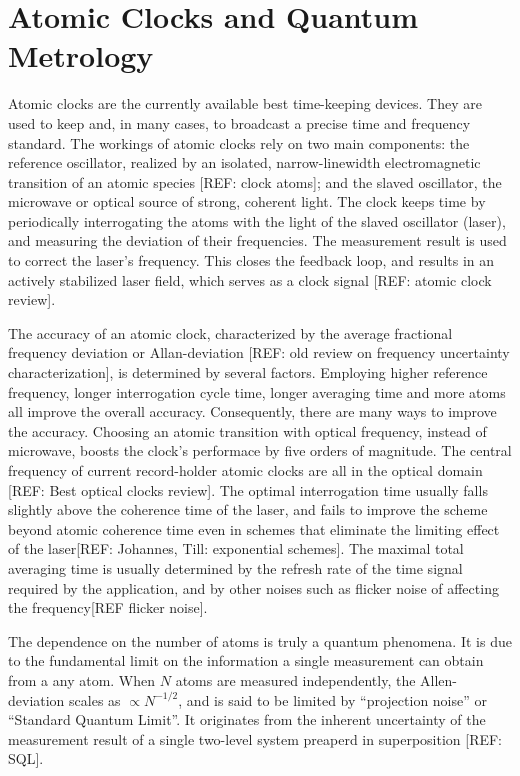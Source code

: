 \section{Atomic Clocks and Quantum Metrology}
Atomic clocks are the currently available best time-keeping devices. They are
used to keep and, in many cases, to broadcast a precise time and frequency
standard. The workings of atomic clocks rely on two main components: the
reference oscillator, realized by an isolated, narrow-linewidth
electromagnetic transition of an atomic species [REF: clock atoms]; and the
slaved oscillator, the microwave or optical source of strong, coherent light. The clock keeps time by
periodically interrogating the atoms with the light of the slaved
oscillator (laser), and measuring the deviation of their frequencies. The
measurement result is used to correct the laser's frequency. This closes the
feedback loop, and results in an actively stabilized laser field, which serves
as a clock signal [REF: atomic clock review].

The accuracy of an atomic clock, characterized by the average fractional
frequency deviation or Allan-deviation [REF: old review on frequency
uncertainty characterization], is determined by several factors. Employing
higher reference frequency, longer interrogation cycle time, longer averaging
time and more atoms all improve the overall accuracy. Consequently, there are
many ways to improve the accuracy. Choosing an atomic transition with optical
frequency, instead of microwave, boosts the clock's performace by five orders of
magnitude. The central frequency of current record-holder atomic clocks are all
in the optical domain [REF:
Best optical clocks review]. The optimal interrogation time usually falls
slightly above the coherence time of the laser, and fails to improve the scheme
beyond atomic coherence time even in schemes that eliminate the limiting effect
of the laser[REF: Johannes, Till: exponential schemes]. The maximal total
averaging time is usually determined by the refresh rate of the time
signal required by the application, and by other noises such as flicker noise of
affecting the frequency[REF flicker noise].

The dependence on the number of atoms is truly a quantum phenomena. It is due to
the fundamental limit on the information a single measurement can obtain from a
any atom. When $N$ atoms are measured independently, the Allen-deviation scales
as $\propto N^{-1/2}$, and is said to be limited by ``projection noise'' or
``Standard Quantum Limit''. It originates from the inherent uncertainty of
the measurement result of a single two-level system preaperd in superposition
[REF: SQL].

